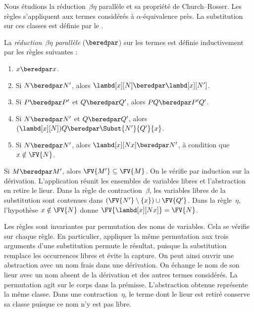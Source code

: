 \documentclass[../../../include/open-logic-section]{subfiles}
\begin{document}

Nous étudions la réduction~$\beta\eta$ parallèle et sa
propriété de Church--Rosser. Les règles s'appliquent aux
termes considérés à $\alpha$-équivalence près. La substitution
sur ces classes est définie par le .

\begin{defn}
La \emph{réduction~$\beta\eta$ parallèle}
($\beredpar$) sur les termes est définie
inductivement par les règles suivantes :
\begin{enumerate}
\item {}
  $x \beredpar x$.
\item {}
  Si $N \beredpar N'$, alors
  $\lambd[x][N] \beredpar \lambd[x][N']$.
\item {}
  Si $P \beredpar P'$ et $Q \beredpar Q'$,
  alors $PQ \beredpar P'Q'$.
\item {}
  Si $N \beredpar N'$ et $Q \beredpar Q'$,
  alors $(\lambd[x][N])Q \beredpar
  \Subst{N'}{Q'}{x}$.
\item {}
  Si $N \beredpar N'$, alors
  $\lambd[x][Nx]\beredpar N'$,
  à condition que $x\notin\FV{N}$.
\end{enumerate}
\end{defn}

Si $M\beredpar M'$, alors $\FV{M'}\subseteq\FV{M}$.
On le vérifie par induction sur la dérivation. L'application
réunit les ensembles de variables libres et l'abstraction en
retire le lieur. Dans la règle de contraction~$\beta$, les
variables libres de la substitution sont contenues dans
$(\FV{N'}\setminus\{x\})\cup\FV{Q'}$. Dans la règle~$\eta$,
l'hypothèse $x\notin\FV{N}$ donne
$\FV{\lambd[x][Nx]}=\FV{N}$.

Les règles sont invariantes par permutation des noms de variables.
Cela se vérifie sur chaque règle. En particulier, appliquer la
même permutation aux trois arguments d'une substitution permute
le résultat, puisque la substitution remplace les occurrences
libres et évite la capture. On peut ainsi ouvrir une abstraction
avec un nom frais dans une dérivation. On échange le nom de son
lieur avec un nom absent de la dérivation et des autres termes
considérés. La permutation agit sur le corps dans la prémisse.
L'abstraction obtenue représente la même classe. Dans une
contraction~$\eta$, le terme dont le lieur est retiré conserve
sa classe puisque ce nom n'y est pas libre.
\end{document}
